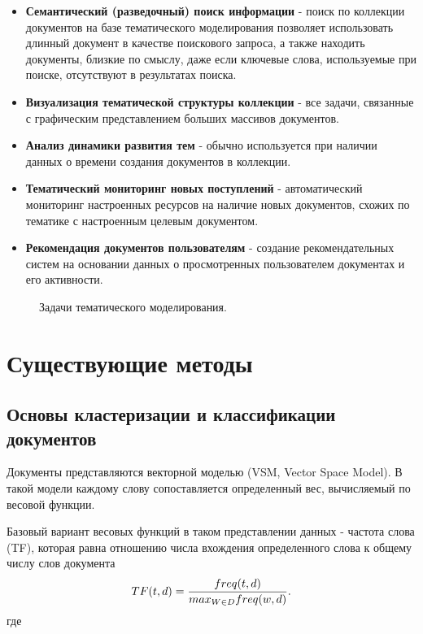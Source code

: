 \begin{itemize}
    \item \textbf{Семантический (разведочный) поиск информации} - поиск по коллекции документов на базе тематического моделирования позволяет использовать длинный документ в качестве поискового запроса, а также находить документы, близкие по смыслу, даже если ключевые слова, используемые при поиске, отсутствуют в результатах поиска.
    \item \textbf{Визуализация тематической структуры коллекции} - все задачи, связанные с графическим представлением больших массивов документов.
    \item \textbf{Анализ динамики развития тем} - обычно используется при наличии данных о времени создания документов в коллекции.
    \item \textbf{Тематический мониторинг новых поступлений} - автоматический мониторинг настроенных ресурсов на наличие новых документов, схожих по тематике с настроенным целевым документом.
    \item \textbf{Рекомендация документов пользователям} - создание рекомендательных систем на основании данных о просмотренных пользователем документах и его активности.
\end{itemize}

\begin{figure}[h]
    \caption{Задачи тематического моделирования.}
    \label{fig:TaskTM}
\end{figure}

%
\section{Существующие методы}

\subsection{Основы кластеризации и классификации документов}

Документы представляются векторной моделью (VSM, Vector Space Model). В такой модели каждому слову сопоставляется определенный вес, вычисляемый по весовой функции.

Базовый вариант весовых функций в таком представлении данных - частота слова (TF), которая равна отношению числа вхождения определенного слова к общему числу слов документа
\begin{equation}
TF(t,d)={{freq(t,d)}\over{max_{W \in D} freq(w,d)}}.
\end{equation}
где

